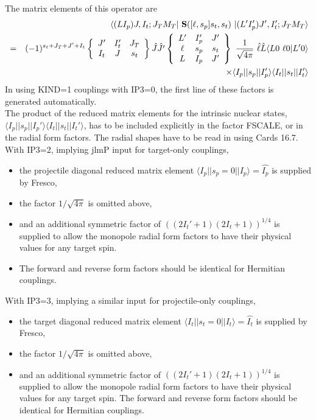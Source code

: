 \documentclass[11pt]{article}
\begin{document}
The  matrix elements of this operator are
\begin{eqnarray}
&& \langle(LI_p)J,I_t;J_TM_T | ~{\bf S}([\ell,s_p]s_t,s_t) ~| (L'I_p')J',I_t';J_TM_T \rangle
   \nonumber \\
& = &  (-1)^{s_t+J_T+J'+I_t}
   \left\{ \begin{array}{ccc}
    J'  & I_t' & J_T \\
    I_t & J    & s_t \\
    \end{array} \right\}   \hat{J} \hat{J'}
    \left\{ \begin{array}{ccc}
    L' & I_p' & J'  \\
    \ell & s_p & s_t  \\
    L & I_p & J'  \\
    \end{array} \right\}  ~
     \frac{1}{\sqrt{4\pi}} ~ \hat{\ell} \hat{L} \langle L 0 \ \ell 0 | L'0 \rangle   \nonumber \\
    &  &   \times \langle I_p||s_p||I_p'\rangle \langle I_t||s_t||I_t'\rangle
\end{eqnarray}
In using KIND=1 couplings with IP3=0, the first line of these factors is generated automatically. \\
The product of the
reduced matrix elements for the intrinsic nuclear states,
$\langle I_p||s_p||I_p'\rangle \langle I_t||s_t||I_t'\rangle$,
 has to be included explicitly in the factor FSCALE,
 or in the radial form factors.
The radial shapes have to be read in using Cards 16.7.\\

With IP3=2, implying jlmP input for target-only couplings,
\begin{itemize}
\item
 the projectile diagonal reduced matrix element
$\langle I_p||s_p=0||I_p\rangle = \hat{I_p}$ is supplied by Fresco,
\item
the factor $1/\sqrt{4\pi}$ is omitted above,
\item
and an additional symmetric factor of
$((2I_t'+1)(2I_t+1))^{1/4}$
is supplied to allow the
monopole radial form factors to have their physical
values for any target spin.
\item
The forward and reverse form factors should be identical for Hermitian couplings.

\end{itemize}

With IP3=3, implying a similar input for projectile-only couplings,
\begin{itemize}
\item
 the target diagonal reduced matrix element
 $\langle I_t||s_t=0||I_t\rangle = \hat{I_t}$ is supplied by Fresco,
 \item
 the factor $1/\sqrt{4\pi}$ is omitted above,
 \item
 and an additional symmetric factor of $((2I_t'+1)(2I_t+1))^{1/4}$
 is supplied to allow the monopole radial form factors to have their physical
 values for any target spin.
 The forward and reverse form factors should be identical for Hermitian couplings.
\end{itemize}
\end{document}
